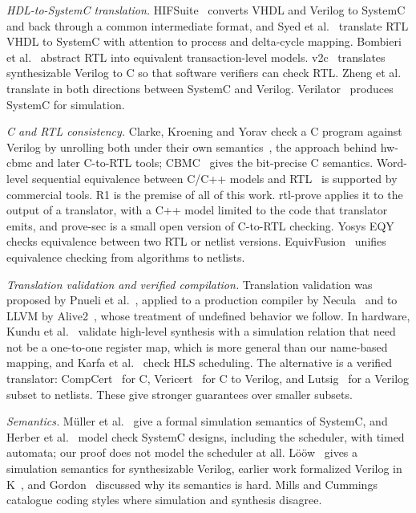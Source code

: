 \documentclass[conference]{IEEEtran}
\newcommand{\code}[1]{{\fontshape{n}\ttfamily #1}}
\begin{document}
\emph{HDL-to-SystemC translation.} HIFSuite~\cite{bombieri2010hifsuite} converts VHDL and Verilog
to SystemC and back through a common intermediate format, and Syed et al.~\cite{syed2013vhdl2sc}
translate RTL VHDL to SystemC with attention to process and delta-cycle mapping. Bombieri et
al.~\cite{bombieri2011rtl2tlm} abstract RTL into equivalent transaction-level models.
v2c~\cite{mukherjee2016v2c} translates synthesizable Verilog to C so that software verifiers can
check RTL. Zheng et al.~\cite{zheng2026bidir} translate in both directions between SystemC and
Verilog. Verilator~\cite{snyder2020verilator} produces SystemC for simulation.

\emph{C and RTL consistency.} Clarke, Kroening and Yorav check a C program against Verilog by
unrolling both under their own semantics~\cite{clarke2003cverilog}, the approach behind
hw-cbmc and later C-to-RTL tools; CBMC~\cite{clarke2004cbmc,kroening2023cbmc} gives the
bit-precise C semantics. Word-level sequential equivalence between C/C++ models and
RTL~\cite{koelbl2009c2rtl} is supported by commercial tools. R1 is the premise of all of this
work. \code{rtl-prove} applies it to the output of a translator, with a C++ model limited to the
code that translator emits, and \code{prove-sec} is a small open version of C-to-RTL checking.
Yosys EQY~\cite{yosys_eqy} checks equivalence between two RTL or netlist versions.
EquivFusion~\cite{zhu2026equivfusion} unifies equivalence checking from algorithms to netlists.

\emph{Translation validation and verified compilation.} Translation validation was proposed by
Pnueli et al.~\cite{pnueli1998tv}, applied to a production compiler by Necula~\cite{necula2000tv}
and to LLVM by Alive2~\cite{lopes2021alive2}, whose treatment of undefined behavior we follow. In
hardware, Kundu et al.~\cite{kundu2010tvhls} validate high-level synthesis with a simulation
relation that need not be a one-to-one register map, which is more general than our name-based
mapping, and Karfa et al.~\cite{karfa2008equiv} check HLS scheduling. The alternative is a verified
translator: CompCert~\cite{leroy2009compcert} for C, Vericert~\cite{herklotz2021vericert} for C to
Verilog, and Lutsig~\cite{loow2021lutsig} for a Verilog subset to netlists. These give stronger
guarantees over smaller subsets.

\emph{Semantics.} Müller et al.~\cite{mueller2001scsem} give a formal simulation semantics of
SystemC, and Herber et al.~\cite{herber2008scta} model check SystemC designs, including the
scheduler, with timed automata; our proof does not model the scheduler at all. Lööw~\cite{loow2025simsem}
gives a simulation semantics for synthesizable Verilog, earlier work formalized Verilog in
K~\cite{meredith2010kverilog}, and Gordon~\cite{gordon1995semantic} discussed why its semantics is
hard. Mills and Cummings~\cite{mills1999mismatch} catalogue coding styles where simulation and
synthesis disagree.
\end{document}
